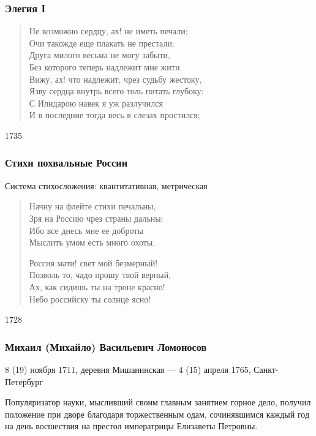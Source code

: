 \documentclass{beamer}
\begin{document}
\begin{frame}
\frametitle{Элегия I}

\begin{verse}
Не возможно сердцу, ах! не иметь печали;\\
Очи такожде еще плакать не престали:\\
Друга милого весьма не могу забыти,\\
Без которого теперь надлежит мне жити.\\
Вижу, ах! что надлежит, чрез судьбу жестоку,\\
Язву сердца внутрь всего толь питать глубоку:\\
С Илидарою навек я уж разлучился\\
И в последние тогда весь в слезах простился;
\end{verse}
1735
\end{frame}



\begin{frame}
\frametitle{Стихи похвальные России}

Система стихосложения: квантитативная, метрическая

\begin{verse}
Начну на флейте стихи печальны,\\
Зря на Россию чрез страны дальны:\\
Ибо все днесь мне ее доброты\\
Мыслить умом есть много охоты.

Россия мати! свет мой безмерный!\\
Позволь то, чадо прошу твой верный,\\
Ах, как сидишь ты на троне красно!\\
Небо российску ты солнце ясно!

\end{verse}
1728

\end{frame}


\begin{frame}
\frametitle{Михаил (Михайло) Васильевич Ломоносов}

\begin{flushleft}
8 (19) ноября 1711, деревня Мишанинская — 4 (15) апреля 1765, Санкт-Петербург
\end{flushleft}

\begin{flushleft}
Популяризатор науки, мысливший своим главным занятием горное дело, получил положение при дворе благодаря торжественным одам, сочинявшимся каждый год на день восшествия на престол императрицы Елизаветы Петровны. 
\end{flushleft}

\end{frame}
\end{document}

